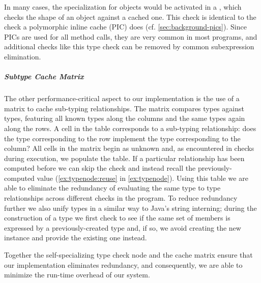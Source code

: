 In many cases, the specialization for objects would be activated in a ,
which checks the shape of an object against a cached one.
This check is identical to the check a polymorphic inline cache (PIC) does (cf. \cref{sec:background-pics}).
Since PICs are used for all method calls,
they are very common in most programs,
and additional checks like this type check can be removed
by common subexpression elimination.


\subparagraph{Subtype Cache Matrix}
The other performance-critical aspect to our implementation
is the use of a matrix to cache sub-typing relationships.
The matrix compares types against types,
featuring all known types along the columns and the same types again along the rows.
A cell in the table corresponds to a sub-typing relationship:
does the type corresponding to the row implement
the type corresponding to the column?
All cells in the matrix begin as unknown and, as
encountered in checks during execution, we populate the table.
If a particular relationship has been computed before
we can skip the check and instead recall the previously-computed value
(\cref{ex:typenode:reuse} in \cref{ex:typenode}).
Using this table we are able to eliminate the redundancy of evaluating
the same type to type relationships across different checks in the program. To reduce redundancy further we also unify types in a similar way to Java's string interning; 
during the construction of a type we first check to see if the same
set of members is expressed by a previously-created type and, if so,
we avoid creating the new instance and provide the existing one instead.


Together the self-specializing type check node and the cache matrix 
ensure that our implementation eliminates redundancy, and
consequently, we are able to minimize the run-time overhead of our system. 



